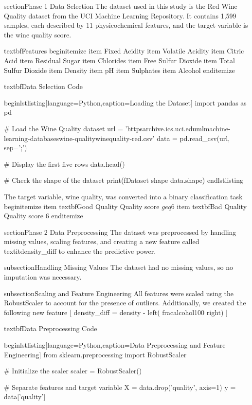 section{Phase 1 Data Selection}
The dataset used in this study is the Red Wine Quality dataset from the UCI Machine Learning Repository. It contains 1,599 samples, each described by 11 physicochemical features, and the target variable is the wine quality score.

textbf{Features}
begin{itemize}
    item Fixed Acidity
    item Volatile Acidity
    item Citric Acid
    item Residual Sugar
    item Chlorides
    item Free Sulfur Dioxide
    item Total Sulfur Dioxide
    item Density
    item pH
    item Sulphates
    item Alcohol
end{itemize}

textbf{Data Selection Code}

begin{lstlisting}[language=Python,caption=Loading the Dataset]
import pandas as pd

# Load the Wine Quality dataset
url = 'httpsarchive.ics.uci.edumlmachine-learning-databaseswine-qualitywinequality-red.csv'
data = pd.read_csv(url, sep=';')

# Display the first five rows
data.head()

# Check the shape of the dataset
print(fDataset shape {data.shape})
end{lstlisting}

The target variable, wine quality, was converted into a binary classification task
begin{itemize}
    item textbf{Good Quality} Quality score $geq 6$
    item textbf{Bad Quality} Quality score $ 6$
end{itemize}

section{Phase 2 Data Preprocessing}
The dataset was preprocessed by handling missing values, scaling features, and creating a new feature called textit{density_diff} to enhance the predictive power.

subsection{Handling Missing Values}
The dataset had no missing values, so no imputation was necessary.

subsection{Scaling and Feature Engineering}
All features were scaled using the RobustScaler to account for the presence of outliers. Additionally, we created the following new feature
[
density_diff = density - left( frac{alcohol}{100} right)
]

textbf{Data Preprocessing Code}

begin{lstlisting}[language=Python,caption=Data Preprocessing and Feature Engineering]
from sklearn.preprocessing import RobustScaler

# Initialize the scaler
scaler = RobustScaler()

# Separate features and target variable
X = data.drop('quality', axis=1)
y = data['quality']

